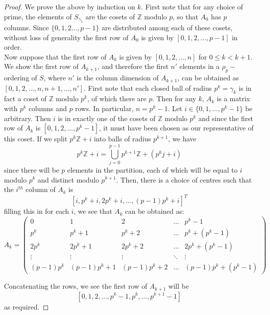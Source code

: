 \begin{proof}
We prove the above by induction on $k$. First note that for any choice of prime, the elements of $S_{\gamma_1}$ are the cosets of $\mathbb{Z}$ modulo $p$, so that $A_0$ has $p$ columns. Since $\{0,1,2\ldots,p-1\}$ are distributed among each of these cosets, without loss of generality the first row of $A_0$ is given by $[0,1,2,\ldots, p-1]$ in order.\\

Now suppose that the first row of $A_k$ is given by $[0,1,2,\ldots,n]$ for $0 \leq k < k+1$. We show the first row of $A_{k+1}$, and therefore the first $n'$ elements in a $\rho_p-$ordering of $S$, where $n'$ is the column dimension of $A_{k+1}$, can be obtained as $[0,1,2,\ldots,n,n+1,\ldots,n']$. First note that each closed ball of radius $p^k = \gamma_k$ is in fact a coset of $\mathbb{Z}$ modulo $p^k$, of which there are $p$. Then for any $k$, $A_k$ is a matrix with $p^k$ columns and $p$ rows. In particular, $n=p^k-1$. Let $i \in \{0,1,\ldots,p^{k}-1\}$ be arbitrary. Then $i$ is in exactly one of the cosets of $\mathbb{Z}$ modulo $p^k$ and since the first row of $A_k$ is $[0,1,2,\ldots,p^k-1]$, it must have been chosen as our representative of this coset. If we split $p^k\mathbb{Z}+i$ into balls of radius $p^{k+1}$, we have \[p^k\mathbb{Z}+i = \bigcup_{j=0}^{p-1} p^{k+1}\mathbb{Z} + (p^kj + i) \]
since there will be $p$ elements in the partition, each of which will be equal to $i$ modulo $p^k$ and distinct modulo $p^{k+1}$. Then, there is a choice of centres such that the $i^{th}$ column of $A_{k}$ is \[[i,p^k +i, 2p^k +i,\ldots, (p-1)p^k +i]^T\]
filling this in for each $i$, we see that $A_k$ can be obtained as:
\[A_k=
 \begin{pmatrix}
0 & 1 &  2 & \ldots & p^k -1 \\
p^k & p^k+1 &  p^k+2 & \ldots & p^k+(p^k-1) \\
2p^k & 2p^k+1 &  2p^k+2 & \ldots & 2p^k+(p^k-1) \\
\vdots &  \vdots & \vdots & \ddots & \vdots \\
(p-1)p^k & (p-1)p^k +1 &  (p-1)p^k+2 & \ldots & (p-1)p^k+(p^k-1)
\end{pmatrix}
\]

Concatenating the rows, we see the first row of $A_{k+1}$ will be \[[0,1,2,\ldots,p^k-1,p^k,\ldots,p^{k+1}-1]\] as required. 
\end{proof}

